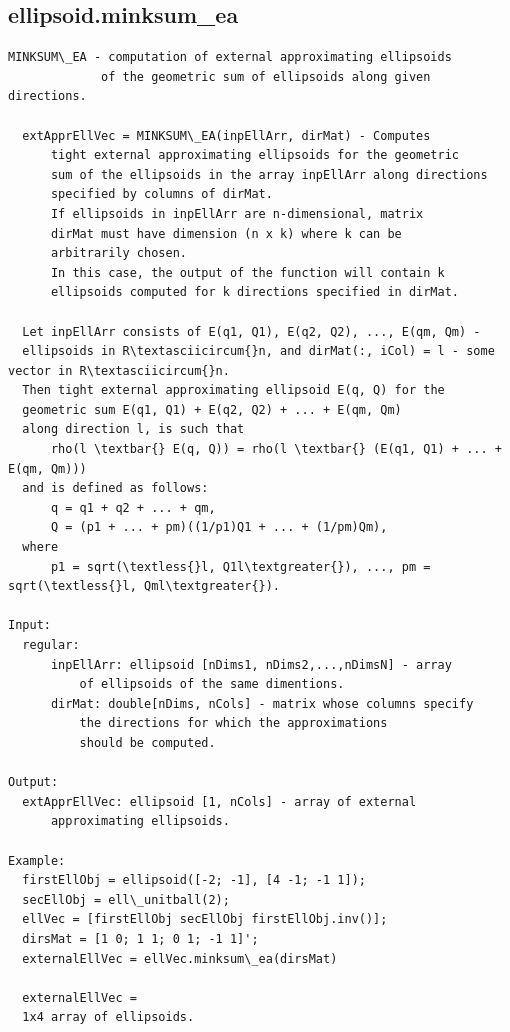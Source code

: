 \documentclass[letterpaper,10pt,english]{sphinxmanual}
\begin{document}
\subsection{ellipsoid.minksum\_ea}
\label{chap_functions:ellipsoid-minksum-ea}
\begin{Verbatim}[commandchars=\\\{\}]
MINKSUM\_EA - computation of external approximating ellipsoids
             of the geometric sum of ellipsoids along given directions.

  extApprEllVec = MINKSUM\_EA(inpEllArr, dirMat) - Computes
      tight external approximating ellipsoids for the geometric
      sum of the ellipsoids in the array inpEllArr along directions
      specified by columns of dirMat.
      If ellipsoids in inpEllArr are n-dimensional, matrix
      dirMat must have dimension (n x k) where k can be
      arbitrarily chosen.
      In this case, the output of the function will contain k
      ellipsoids computed for k directions specified in dirMat.

  Let inpEllArr consists of E(q1, Q1), E(q2, Q2), ..., E(qm, Qm) -
  ellipsoids in R\textasciicircum{}n, and dirMat(:, iCol) = l - some vector in R\textasciicircum{}n.
  Then tight external approximating ellipsoid E(q, Q) for the
  geometric sum E(q1, Q1) + E(q2, Q2) + ... + E(qm, Qm)
  along direction l, is such that
      rho(l \textbar{} E(q, Q)) = rho(l \textbar{} (E(q1, Q1) + ... + E(qm, Qm)))
  and is defined as follows:
      q = q1 + q2 + ... + qm,
      Q = (p1 + ... + pm)((1/p1)Q1 + ... + (1/pm)Qm),
  where
      p1 = sqrt(\textless{}l, Q1l\textgreater{}), ..., pm = sqrt(\textless{}l, Qml\textgreater{}).

Input:
  regular:
      inpEllArr: ellipsoid [nDims1, nDims2,...,nDimsN] - array
          of ellipsoids of the same dimentions.
      dirMat: double[nDims, nCols] - matrix whose columns specify
          the directions for which the approximations
          should be computed.

Output:
  extApprEllVec: ellipsoid [1, nCols] - array of external
      approximating ellipsoids.

Example:
  firstEllObj = ellipsoid([-2; -1], [4 -1; -1 1]);
  secEllObj = ell\_unitball(2);
  ellVec = [firstEllObj secEllObj firstEllObj.inv()];
  dirsMat = [1 0; 1 1; 0 1; -1 1]';
  externalEllVec = ellVec.minksum\_ea(dirsMat)

  externalEllVec =
  1x4 array of ellipsoids.
\end{Verbatim}
\end{document}
